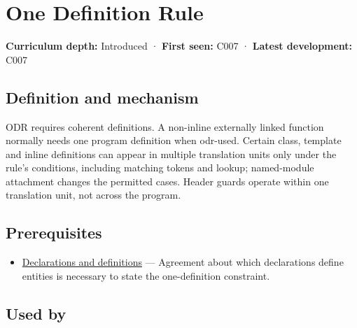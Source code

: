 \hypertarget{appendix-49d27bc9d9a5}{}\label{referencestart:appendix-49d27bc9d9a5}
\section{One Definition Rule}\label{appendix-49d27bc9d9a5-one-definition-rule}

\hypertarget{appendix-49d27bc9d9a5-one-definition-rule}{}

\textbf{Curriculum depth:} Introduced · \textbf{First seen:} C007 · \textbf{Latest development:} C007

\begin{allmightroledefinition}

\subsection{Definition and mechanism}\label{appendix-49d27bc9d9a5-definition-and-mechanism}

\hypertarget{appendix-49d27bc9d9a5-definition-and-mechanism}{}

ODR requires coherent definitions. A non-inline externally linked function normally needs one program definition when odr-used. Certain class, template and inline definitions can appear in multiple translation units only under the rule's conditions, including matching tokens and lookup; named-module attachment changes the permitted cases. Header guards operate within one translation unit, not across the program.

\end{allmightroledefinition}

\subsection{Prerequisites}\label{appendix-49d27bc9d9a5-prerequisites}

\hypertarget{appendix-49d27bc9d9a5-prerequisites}{}

\begin{itemize}
\tightlist
\item
  \hyperref[appendix-2e4d494c2d94]{Declarations and definitions} --- Agreement about which declarations define entities is necessary to state the one-definition constraint.
\end{itemize}

\subsection{Used by}\label{appendix-49d27bc9d9a5-used-by}

